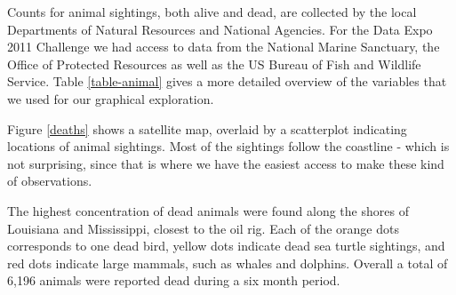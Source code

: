 \documentclass[authoryear,12pt]{elsarticle}
\begin{document}
Counts for animal sightings, both alive and dead, are collected by the local Departments of Natural Resources and National Agencies. For the Data Expo 2011 Challenge we had access to data from the National Marine Sanctuary, the Office of Protected Resources as well as the US Bureau of Fish and Wildlife Service. Table \ref{table-animal} gives a more detailed overview of the variables that we used for our graphical exploration. 

Figure \ref{deaths} shows a satellite map, overlaid by a scatterplot indicating locations of animal sightings. Most of the sightings follow the coastline - which is not surprising, since that is where we have the easiest access to make these kind of observations. 

%
%

The highest concentration of dead animals were found along the shores of Louisiana and Mississippi, closest to the oil rig. Each of the orange dots corresponds to one dead bird, yellow dots indicate dead sea turtle sightings, and red dots indicate large mammals, such as whales and dolphins. Overall a total of 6,196 animals were reported dead during a six month period.
\end{document}
